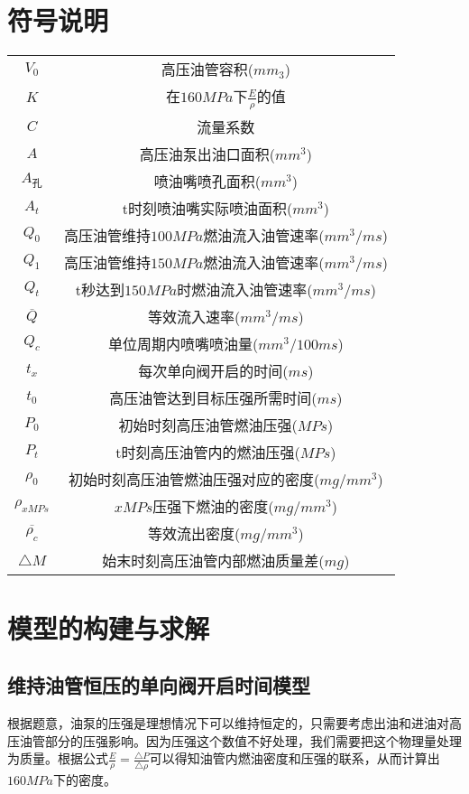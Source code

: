 \documentclass{cumcmthesis}
\begin{document}
\section{符号说明}
\begin{center}
	\begin{tabular}{cc}
		\toprule
		\makebox[0.3\textwidth][c]{符号}	&  \makebox[0.4\textwidth][c]{意义} \\ \midrule
		$V_{0}$	  & 高压油管容积($mm_{3}$)\\ 
		$K$       & 在$160MPa$下$\frac{E}{\rho}$的值\\
		$C$       & 流量系数\\
		$A$       & 高压油泵出油口面积($mm^{3}$)\\
		$A_{\text{孔}}$       & 喷油嘴喷孔面积($mm^{3}$)\\
		$A_{t}$       & t时刻喷油嘴实际喷油面积($mm^{3}$)\\
		$Q_{0}$   & 高压油管维持$100MPa$燃油流入油管速率($mm^{3}/ms$)\\
		$Q_{1}$   & 高压油管维持$150MPa$燃油流入油管速率($mm^{3}/ms$)\\
		$Q_{t}$   & t秒达到$150MPa$时燃油流入油管速率($mm^{3}/ms$)\\
		$\overline{Q}$    & 等效流入速率($mm^{3}/ms$)\\
		$Q_{c}$   & 单位周期内喷嘴喷油量($mm^{3}/100ms$)\\
		$t_{x}$   & 每次单向阀开启的时间($ms$)\\
		$t_{0}$   & 高压油管达到目标压强所需时间($ms$)\\
		$P_{0}$   & 初始时刻高压油管燃油压强($MPs$)\\
		$P_{t}$   & t时刻高压油管内的燃油压强($MPs$)\\
		$\rho_{0}$   & 初始时刻高压油管燃油压强对应的密度($mg/mm^{3}$)\\
		$\rho_{xMPs}$   & $xMPs$压强下燃油的密度($mg/mm^{3}$)\\
		$\overline{\rho_{c}}$   & 等效流出密度($mg/mm^{3}$)\\
		${\triangle M}$   & 始末时刻高压油管内部燃油质量差($mg$)\\
		\bottomrule
	\end{tabular}
\end{center}
\section{模型的构建与求解}
\subsection{维持油管恒压的单向阀开启时间模型}
根据题意，油泵的压强是理想情况下可以维持恒定的，只需要考虑出油和进油对高压油管部分的压强影响。因为压强这个数值不好处理，我们需要把这个物理量处理为质量。根据公式$\frac{E}{\rho} = \frac{\triangle P}{\triangle \rho}$可以得知油管内燃油密度和压强的联系，从而计算出$160MPa$下的密度。
\end{document}
